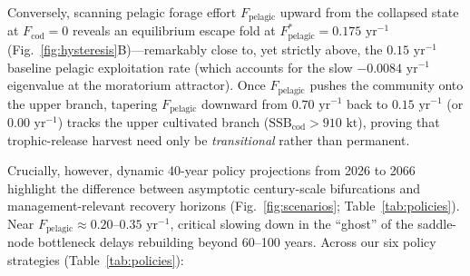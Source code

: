 \documentclass[11pt,letterpaper]{article}
\begin{document}
Conversely, scanning pelagic forage effort $F_{\mathrm{pelagic}}$ upward from the collapsed state at $F_{\mathrm{cod}} = 0$ reveals an equilibrium escape fold at $F_{\mathrm{pelagic}}^{*} = 0.175\text{ yr}^{-1}$ (Fig.~\ref{fig:hysteresis}B)---remarkably close to, yet strictly above, the $0.15\text{ yr}^{-1}$ baseline pelagic exploitation rate (which accounts for the slow $-0.0084\text{ yr}^{-1}$ eigenvalue at the moratorium attractor). Once $F_{\mathrm{pelagic}}$ pushes the community onto the upper branch, tapering $F_{\mathrm{pelagic}}$ downward from $0.70\text{ yr}^{-1}$ back to $0.15\text{ yr}^{-1}$ (or $0.00\text{ yr}^{-1}$) tracks the upper cultivated branch ($\mathrm{SSB}_{\mathrm{cod}} > 910\text{ kt}$), proving that trophic-release harvest need only be \emph{transitional} rather than permanent.

Crucially, however, dynamic 40-year policy projections from 2026 to 2066 highlight the difference between asymptotic century-scale bifurcations and management-relevant recovery horizons (Fig.~\ref{fig:scenarios}; Table~\ref{tab:policies}). Near $F_{\mathrm{pelagic}} \approx 0.20$--$0.35\text{ yr}^{-1}$, critical slowing down in the ``ghost'' of the saddle-node bottleneck delays rebuilding beyond 60--100 years. Across our six policy strategies (Table~\ref{tab:policies}):
\end{document}
